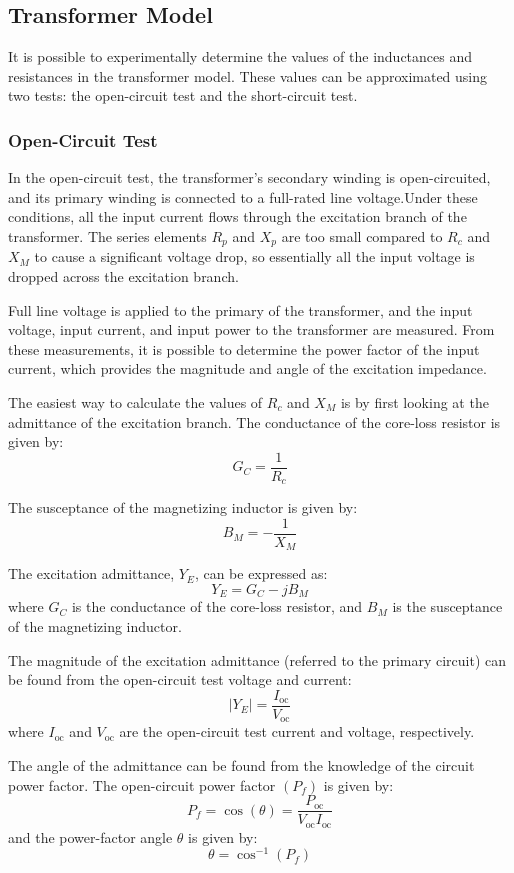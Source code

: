 \documentclass[a4paper,12pt]{article}
\begin{document}
	
	\subsection{Transformer Model}
	
	It is possible to experimentally determine the values of the inductances and resistances in the transformer model. These values can be approximated using two tests: the open-circuit test and the short-circuit test.
		\subsubsection{Open-Circuit Test}
	In the open-circuit test, the transformer's secondary winding is open-circuited, and its primary winding is connected to a full-rated line voltage.Under these conditions, all the input current flows through the excitation branch of the transformer. The series elements $R_p$ and $X_p$ are too small compared to $R_c$ and $X_M$ to cause a significant voltage drop, so essentially all the input voltage is dropped across the excitation branch.
	
	 Full line voltage is applied to the primary of the transformer, and the input voltage, input current, and input power to the transformer are measured. From these measurements, it is possible to determine the power factor of the input current, which provides the magnitude and angle of the excitation impedance.
	
	The easiest way to calculate the values of $R_c$ and $X_M$ is by first looking at the admittance of the excitation branch. The conductance of the core-loss resistor is given by:
	\[
	G_C = \frac{1}{R_c}
	\]
	
	The susceptance of the magnetizing inductor is given by:
	\[
	B_M = -\frac{1}{X_M}
	\]
	
	
	The excitation admittance, $Y_E$, can be expressed as:
	\[
	Y_E = G_C - j B_M
	\]
	where $G_C$ is the conductance of the core-loss resistor, and $B_M$ is the susceptance of the magnetizing inductor.
	
	The magnitude of the excitation admittance (referred to the primary circuit) can be found from the open-circuit test voltage and current:
	\[
	|Y_E| = \frac{I_{\text{oc}}}{V_{\text{oc}}}
	\]
	where $I_{\text{oc}}$ and $V_{\text{oc}}$ are the open-circuit test current and voltage, respectively.
	
	The angle of the admittance can be found from the knowledge of the circuit power factor. The open-circuit power factor $(P_f)$ is given by:
	\[
	P_f = \cos(\theta) = \frac{P_{\text{oc}}}{V_{\text{oc}}I_{\text{oc}}}
	\]
	and the power-factor angle $\theta$ is given by:
	\[
	\theta = \cos^{-1}(P_f)
	\]
	
\end{document}
